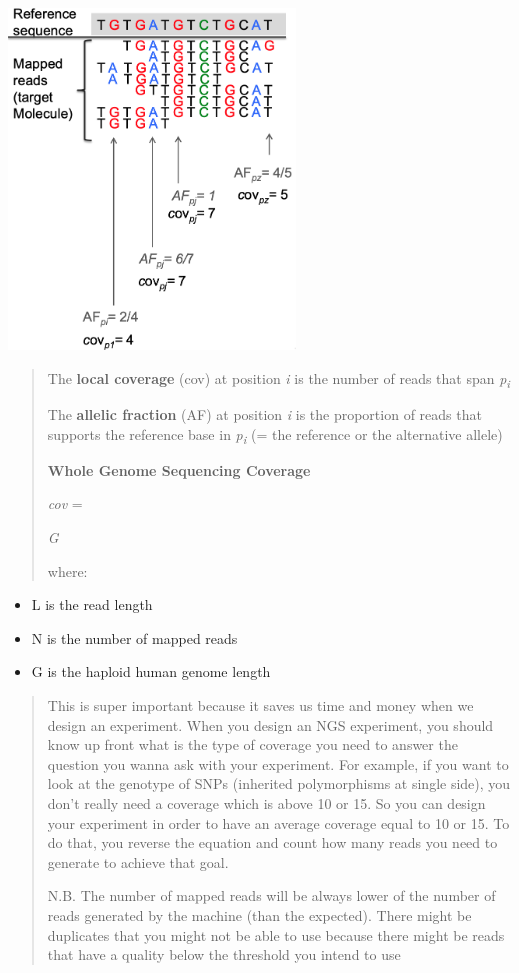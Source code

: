 \includegraphics[width=3.00163in,height=3.56687in]{image14.png}

\begin{quote}
The \textbf{local coverage} (cov) at position \emph{i} is the number of
reads that span \emph{p\textsubscript{i}}

The \textbf{allelic fraction} (AF) at position \emph{i} is the
proportion of reads that supports the reference base in
\emph{p\textsubscript{i}} (= the reference or the alternative allele)

\textbf{Whole Genome Sequencing Coverage}


\emph{cov} =

\emph{G}

where:
\end{quote}

\begin{itemize}
\item
  L is the read length
\item
  N is the number of mapped reads
\item
  G is the haploid human genome length
\end{itemize}

\begin{quote}
This is super important because it saves us time and money when we
design an experiment. When you design an NGS experiment, you should know
up front what is the type of coverage you need to answer the question
you wanna ask with your experiment. For example, if you want to look at
the genotype of SNPs (inherited polymorphisms at single side), you don't
really need a coverage which is above 10 or 15. So you can design your
experiment in order to have an average coverage equal to 10 or 15. To do
that, you reverse the equation and count how many reads you need to
generate to achieve that goal.

N.B. The number of mapped reads will be always lower of the number of
reads generated by the machine (than the expected). There might be
duplicates that you might not be able to use because there might be
reads that have a quality below the threshold you intend to use
\end{quote}

